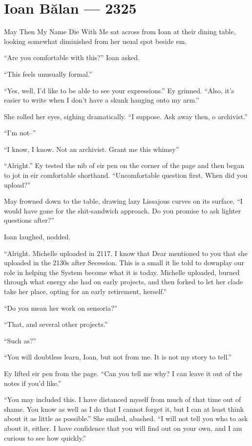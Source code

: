 \hypertarget{ioan-bux103lan-2325}{%
\chapter{Ioan Bălan — 2325}\label{ioan-bux103lan-2325}}

May Then My Name Die With Me sat across from Ioan at their dining table, looking somewhat diminished from her usual spot beside em.

``Are you comfortable with this?'' Ioan asked.

``This feels unusually formal.''

``Yes, well, I'd like to be able to see your expressions.'' Ey grinned. ``Also, it's easier to write when I don't have a skunk hanging onto my arm.''

She rolled her eyes, sighing dramatically. ``I suppose. Ask away then, o archivist.''

``I'm not--''

``I know, I know. Not an archivist. Grant me this whimsy''

``Alright.'' Ey tested the nib of eir pen on the corner of the page and then began to jot in eir comfortable shorthand. ``Uncomfortable question first. When did you upload?''

May frowned down to the table, drawing lazy Lissajous curves on its surface. ``I would have gone for the shit-sandwich approach. Do you promise to ask lighter questions after?''

Ioan laughed, nodded.

``Alright. Michelle uploaded in 2117. I know that Dear mentioned to you that she uploaded in the 2130s after Secession. This is a small it lie told to downplay our role in helping the System become what it is today. Michelle uploaded, burned through what energy she had on early projects, and then forked to let her clade take her place, opting for an early retirement, herself.''

``Do you mean her work on sensoria?''

``That, and several other projects.''

``Such as?''

``You will doubtless learn, Ioan, but not from me. It is not my story to tell.''

Ey lifted eir pen from the page. ``Can you tell me why? I can leave it out of the notes if you'd like.''

``You may included this. I have distanced myself from much of that time out of shame. You know as well as I do that I cannot forget it, but I can at least think about it as little as possible.'' She smiled, abashed. ``I will not tell you who to ask about it, either. I have confidence that you will find out on your own, and I am curious to see how quickly.''

